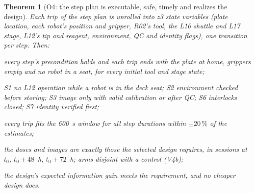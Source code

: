 \documentclass[10pt,a4paper]{article}
\theoremstyle{plain}\newtheorem{theorem}{Theorem}\newtheorem{lemma}{Lemma}\newtheorem{corollary}{Corollary}
\theoremstyle{definition}\newtheorem{definition}{Definition}\newtheorem{assumption}{Assumption}
\theoremstyle{remark}\newtheorem*{remark}{Remark}
\begin{document}
\begin{theorem}[O4: the step plan is executable, safe, timely and realizes the design]\label{thm:steps}
Each trip of the step plan is unrolled into z3 state variables (plate location, each robot's position and gripper,
R02's tool, the L10 shuttle and L17 stage, L12's tip and reagent, environment, QC and identity flags), one transition
per step. Then:
\begin{description}[leftmargin=2em, style=nextline]
\item[V1 executability and preservation] every step's precondition holds and each trip ends with the plate at home,
grippers empty and no robot in a seat, for every initial tool and stage state;
\item[V2 safety] S1 no L12 operation while a robot is in the deck seat; S2 environment checked before storing; S3 image
only with valid calibration or after QC; S6 interlocks closed; S7 identity verified first;
\item[V3 time] every trip fits the 600~s window for all step durations within $\pm 20\,\%$ of the estimates;
\item[V4 realization] the doses and images are exactly those the selected design requires, in sessions at
$t_0$, $t_0 + 48$~h, $t_0 + 72$~h; arms disjoint with a control (V4b);
\item[V5 gain and cost] the design's expected information gain meets the requirement, and no cheaper design does.
\end{description}
\end{theorem}
\end{document}
